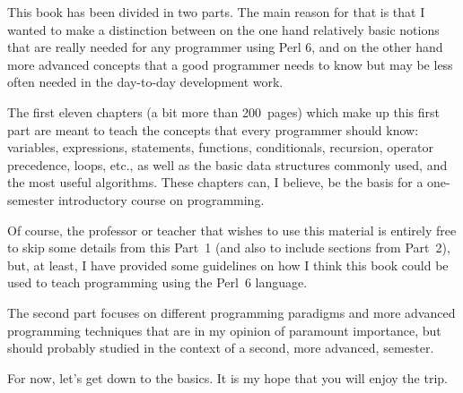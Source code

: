 %

This book has been divided in two parts. The main reason for that
is that I wanted to make a distinction between on the one hand 
relatively basic notions that are really needed for any programmer 
using Perl 6, and on the other hand more advanced concepts that 
a good programmer needs to know but may be less often needed in 
the day-to-day development work.

The first eleven chapters (a bit more than 200~pages) which make up 
this first part are meant to teach the concepts that every 
programmer should know: variables, expressions, statements, 
functions, conditionals, recursion, operator precedence, loops, etc., 
as well as the basic data structures commonly used, and the most 
useful algorithms.  These chapters can, I believe, be the basis 
for a one-semester introductory course on programming. 

Of course, the professor or teacher that wishes to use this 
material is entirely free to skip some details from this 
Part~1 (and also to include sections from Part~2), but, at 
least, I have provided some guidelines on how I think this 
book could be used to teach programming using the Perl~6 language.

The second part focuses on different programming paradigms and 
more advanced programming techniques that are in my opinion of 
paramount importance, but should probably studied in the context 
of a second, more advanced, semester.

For now, let's get down to the basics. It is my hope that you 
will enjoy the trip.

